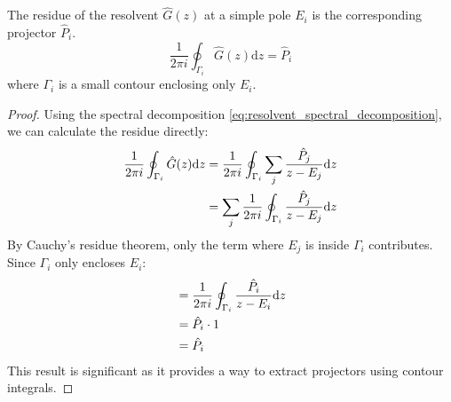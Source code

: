 \begin{theorem}
    The residue of the resolvent $\hat G(z)$ at a simple pole $E_i$
    is the corresponding projector $\hat P_i$.
    \begin{equation} \label{eq:resolvent_residue}
        \frac{1}{2\pi i}\oint_{\Gamma_i} \hat G(z)\mathrm dz = \hat P_i
    \end{equation}
    where $\Gamma_i$ is a small contour enclosing only $E_i$.
\end{theorem}
\begin{proof}
    Using the spectral decomposition
    \eqref{eq:resolvent_spectral_decomposition}, we can calculate the
    residue directly:
    \begin{align}
        \frac{1}{2\pi i}\oint_{\Gamma_i} \hat G(z)\mathrm dz &=
        \frac{1}{2\pi i}\oint_{\Gamma_i} \sum_j \frac{\hat P_j}{z -
        E_j}\mathrm dz \\
        &= \sum_j \frac{1}{2\pi i}\oint_{\Gamma_i} \frac{\hat P_j}{z
        - E_j}\mathrm dz \notag
    \end{align}
    By Cauchy's residue theorem, only the term where $E_j$ is inside
    $\Gamma_i$ contributes. Since $\Gamma_i$ only encloses $E_i$:
    \begin{align}
        &= \frac{1}{2\pi i}\oint_{\Gamma_i} \frac{\hat P_i}{z -
        E_i}\mathrm dz \\
        &= \hat P_i \cdot 1 \notag \\
        &= \hat P_i \notag
    \end{align}
    This result is significant as it provides a way to extract
    projectors using contour integrals.
\end{proof}

